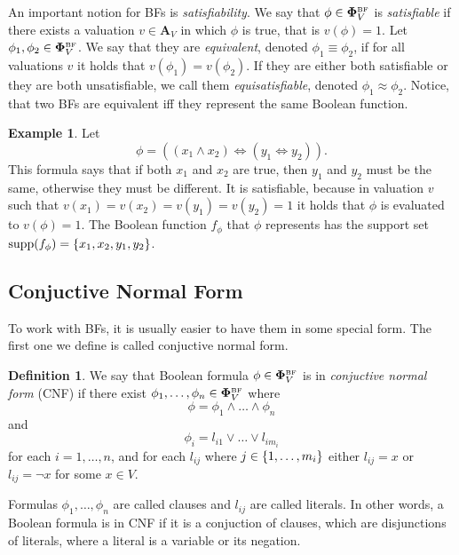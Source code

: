 \documentclass[
  digital, %
  color,
  twoside, %
  table,   %
  nolof,     %
  nolot,     %
]{fithesis3}
\let\setbuilder\set
\newcommand{\simpleset}[1]{\{{#1}\}}
\renewcommand{\set}[1]{\normalexpandarg\IfSubStr{#1}{|}{\setbuilder{#1}}{\simpleset{#1}}}
\theoremstyle{definition}
\newtheorem{definition}{Definition}
\newtheorem{example}{Example}
\theoremstyle{remark}
\newcommand{\BF}[1]{\mathbf{\Phi}_{#1}^{\normalfont{\text{\tiny BF}}}}
\newcommand{\valtns}[1]{\mathbf{A}_{#1}}
\newcommand{\supp}[1]{\mathrm{supp}(#1)}
\newcommand{\lequal}{\Leftrightarrow}
\begin{document}
An important notion for BFs is \emph{satisfiability}. We say that $\phi \in \BF{V}$ is \emph{satisfiable} if there exists a valuation $v \in \valtns{V}$ in which $\phi$ is true, that is $v(\phi) = 1$. Let $\phi_1, \phi_2 \in \BF{V}$. We say that they are \emph{equivalent}, denoted $\phi_1 \equiv \phi_2$, if for all valuations $v$ it holds that $v(\phi_1) = v(\phi_2)$. If they are either both satisfiable or they are both unsatisfiable, we call them \emph{equisatisfiable}, denoted $\phi_1 \approx \phi_2$. Notice, that two BFs are equivalent iff they represent the same Boolean function.

\begin{example}
\label{ex:BF:prenex}
Let
\[\phi = ((x_1 \land x_2) \lequal (y_1 \lequal y_2)).\]
This formula says that if both $x_1$ and $x_2$ are true, then $y_1$ and $y_2$ must be the same, otherwise they must be different. It is satisfiable, because in valuation $v$ such that $v(x_1) = v(x_2) = v(y_1) = v(y_2) = 1$ it holds that $\phi$ is evaluated to $v(\phi)=1$. The Boolean function $f_{\phi}$ that $\phi$ represents has the support set $\supp{f_{\phi}} = \set{x_1, x_2, y_1, y_2}$.
\end{example}

\subsection{Conjuctive Normal Form}
\label{sec:BF:CNF}
To work with BFs, it is usually easier to have them in some special form. The first one we define is called conjuctive normal form.

\begin{definition}
We say that Boolean formula $\phi \in \BF{V}$ is in \emph{conjuctive normal form} (CNF) if there exist $\phi_1,\dots,\phi_n \in \BF{V}$ where
\[\phi = \phi_1 \land \dots \land \phi_n\]
and
\[\phi_i = l_{i1} \lor \dots \lor l_{i{m_i}}\]
for each $i = 1, \dots, n$, and for each $l_{ij}$ where $j \in \set{1,\dots,m_i}$ either $l_{ij} = x$ or $l_{ij} = \neg x$ for some $x \in V$.
\end{definition}
Formulas $\phi_1,\dots,\phi_n$ are called clauses and $l_{ij}$ are called literals. In other words, a Boolean formula is in CNF if it is a conjuction of clauses, which are disjunctions of literals, where a literal is a variable or its negation.
\end{document}
